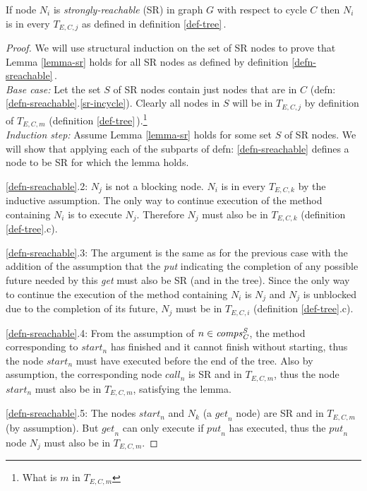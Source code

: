 \begin{lemma}
\label{lemma-sr}
If node $N_i$ is \emph{strongly-reachable} (SR) in graph $G$ with respect to cycle $C$ then $N_i$ is in every $T_{E,C,j}$ as defined in 
definition \ref{def-tree}\,.
\end{lemma}

\begin{proof}
We will use structural induction on the set of SR nodes to prove that Lemma \ref{lemma-sr} 
holds for all SR nodes as defined by definition \ref{defn-sreachable}\,.
\\ \emph%
{Base case:}
Let the set $S$ of SR nodes contain just nodes that are in $C$ (defn: \ref{defn-sreachable}.\ref{sr-incycle}).
Clearly all nodes in $S$ will be in $T_{E,C,j}$ by definition of $T_{E,C,m}$ (definition \ref{def-tree}\,).\footnote{What is $m$ in  $T_{E,C,m}$}
%
\\ \emph%
{Induction step:}
Assume Lemma \ref{lemma-sr}  holds for some set $S$ of SR nodes. We will show that applying each of the subparts of defn: \ref{defn-sreachable}
defines a node to be SR for which the lemma holds.

\ref{defn-sreachable}.2: $N_j$ is not a blocking node. $N_i$ is in every $T_{E,C,k}$ by the inductive assumption. 
The only way to continue execution of the method containing $N_i$ is to execute $N_j$. Therefore 
$N_j$ must also be in $T_{E,C,k}$ (definition \ref{def-tree}.c).

\ref{defn-sreachable}.3: The argument is the same as for the previous case with the addition of the assumption that the \emph{put}
indicating the completion of any possible future needed by this \emph{get}
must also be SR (and in the tree). Since the only way to continue the execution of the method containing $N_i$
is $N_j$ and $N_j$ is unblocked due to the completion of its future, $N_j$ must be in $T_{E,C,i}$ (definition \ref{def-tree}.c).

\ref{defn-sreachable}.4: From the assumption of $n \in {\ensuremath{\mathit{comps_C^{S}}}}$, the method corresponding to
${start}_n$ has finished and it cannot finish without starting, thus
the node ${start}_n$ must have executed before the end of the tree. 
Also by assumption, the corresponding node ${call}_n$ is SR and in $T_{E,C,m}$, thus the node ${start}_n$ must also
be in $T_{E,C,m}$, satisfying the lemma.

\ref{defn-sreachable}.5: The nodes ${start}_n$ and $N_k$ (a ${get}_n$ node) are SR and in $T_{E,C,m}$ (by assumption). But ${get}_n$ can only execute
if ${put}_n$ has executed, thus the ${put}_n$ node $N_j$ must also be in $T_{E,C,m}$.


\end{proof}
